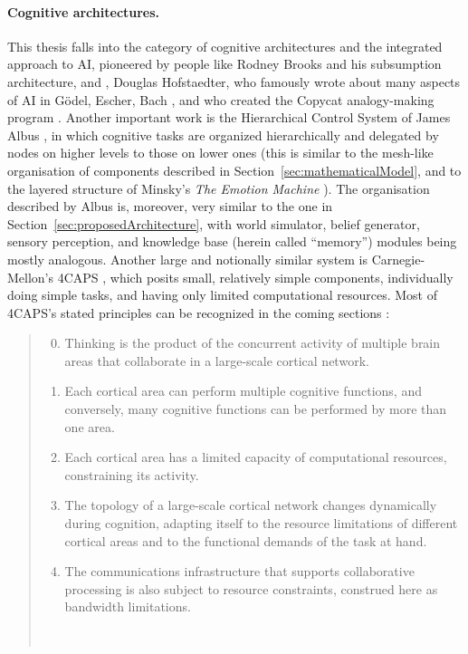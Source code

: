 \paragraph{Cognitive architectures.} This thesis falls into the category of cognitive architectures and the integrated approach to AI, pioneered by people like Rodney Brooks and his subsumption architecture, and \cite{brooksSubsumption}, Douglas Hofstaedter, who famously wrote about many aspects of AI in Gödel, Escher, Bach \cite{geb}, and who created the Copycat analogy-making program \cite{copycat}. Another important work is the Hierarchical Control System of James Albus \cite{albusHCS}, in which cognitive tasks are organized hierarchically and delegated by nodes on higher levels to those on lower ones (this is similar to the mesh-like organisation of components described in Section~\ref{sec:mathematicalModel}, and to the layered structure of Minsky's {\em The Emotion Machine} \cite{emotionMachine}). The organisation described by Albus \cite{albus93areference} is, moreover, very similar to the one in Section~\ref{sec:proposedArchitecture}, with world simulator, belief generator, sensory perception, and knowledge base (herein called ``memory'') modules being mostly analogous. Another large and notionally similar system is Carnegie-Mellon's 4CAPS \cite{4caps}, which posits small, relatively simple components, individually doing simple tasks, and having only limited computational resources. Most of 4CAPS's stated principles can be recognized in the coming sections \cite[Operating Principles of 4CAPS]{4caps}:
\begin{quote}
	\begin{enumerate}
		\setcounter{enumi}{-1}
		\item Thinking is the product of the concurrent activity of multiple brain areas that collaborate in a large-scale cortical network. \ellipses
		\item Each cortical area can perform multiple cognitive functions, and conversely, many cognitive functions can be performed by more than one area.
		\item Each cortical area has a limited capacity of computational resources, constraining its activity.
		\item The topology of a large-scale cortical network changes dynamically during cognition, adapting itself to the resource limitations of different cortical areas and to the functional demands of the task at hand.
		\item The communications infrastructure that supports collaborative processing is also subject to resource constraints, construed here as bandwidth limitations.
	\end{enumerate}
	
	\quad\quad\ \ellipses
\end{quote}

